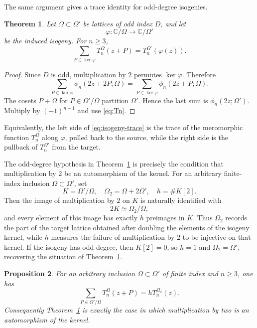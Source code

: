 \documentclass[11pt]{amsart}
\newtheorem{thm}{Theorem}[section]
\newtheorem{prop}[thm]{Proposition}
\theoremstyle{definition}
\theoremstyle{remark}
\numberwithin{equation}{section}
\begin{document}
The same argument gives a trace identity for odd-degree isogenies.

\begin{thm}\label{thm:isogeny-trace}
Let $\Omega\subset\Omega'$ be lattices of odd index $D$, and let
\[
\varphi:\mathbb C/\Omega\longrightarrow\mathbb C/\Omega'
\]
be the induced isogeny. For $n\geq3$,
\begin{equation}\label{eq:isogeny-trace}
\sum_{P\in\ker\varphi}T_n^\Omega(z+P)
=
T_n^{\Omega'}(\varphi(z)).
\end{equation}
\end{thm}

\begin{proof}
Since $D$ is odd, multiplication by $2$ permutes $\ker\varphi$. Therefore
\[
\sum_{P\in\ker\varphi}\phi_n(2z+2P;\Omega)
=
\sum_{P\in\ker\varphi}\phi_n(2z+P;\Omega).
\]
The cosets $P+\Omega$ for $P\in\Omega'/\Omega$ partition $\Omega'$. Hence the last sum is $\phi_n(2z;\Omega')$. Multiply by $(-1)^{n-1}$ and use \eqref{eq:Tn}.
\end{proof}

Equivalently, the left side of \eqref{eq:isogeny-trace} is the trace of the
meromorphic function $T_n^\Omega$ along $\varphi$, pulled back to the source,
while the right side is the pullback of $T_n^{\Omega'}$ from the target.

The odd-degree hypothesis in Theorem~\ref{thm:isogeny-trace} is precisely
the condition that multiplication by \(2\) be an automorphism of the kernel.
For an arbitrary finite-index inclusion \(\Omega\subset\Omega'\), set
\[
K=\Omega'/\Omega,\quad
\Omega_2=\Omega+2\Omega',
\quad
h=\#K[2].
\]
Then the image of multiplication by \(2\) on \(K\) is naturally identified
with
\[
2K\simeq \Omega_2/\Omega,
\]
and every element of this image has exactly \(h\) preimages in \(K\).
Thus \(\Omega_2\) records the part of the target lattice obtained after
doubling the elements of the isogeny kernel, while \(h\) measures the
failure of multiplication by \(2\) to be injective on that kernel.
If the isogeny has odd degree, then \(K[2]=0\), so \(h=1\) and
\(\Omega_2=\Omega'\), recovering the situation of
Theorem~\ref{thm:isogeny-trace}.


\begin{prop}\label{prop:isogeny-even}
For an arbitrary inclusion $\Omega\subset\Omega'$ of finite index and
$n\geq3$, one has
\[
\sum_{P\in\Omega'/\Omega}T_n^\Omega(z+P)
=hT_n^{\Omega_2}(z).
\]
Consequently Theorem~\ref{thm:isogeny-trace} is exactly the case in which
multiplication by two is an automorphism of the kernel.
\end{prop}
\end{document}

